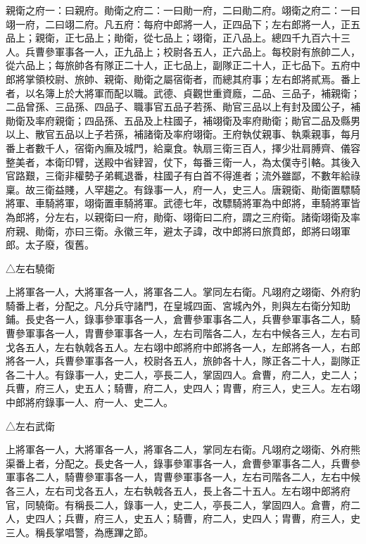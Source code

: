 \begin{pinyinscope}
 親衛之府一：曰親府。勛衛之府二：一曰勛一府，二曰勛二府。翊衛之府二：一曰翊一府，二曰翊二府。凡五府：每府中郎將一人，正四品下；左右郎將一人，正五品上；親衛，正七品上；勛衛，從七品上；翊衛，正八品上。總四千九百六十三人。兵曹參軍事各一人，正九品上；校尉各五人，正六品上。每校尉有旅帥二人，從六品上；每旅帥各有隊正二十人，正七品上，副隊正二十人，正七品下。五府中郎將掌領校尉、旅帥、親衛、勛衛之屬宿衛者，而總其府事；左右郎將貳焉。番上者，以名簿上於大將軍而配以職。武德、貞觀世重資廕，二品、三品子，補親衛；二品曾孫、三品孫、四品子、職事官五品子若孫、勛官三品以上有封及國公子，補勛衛及率府親衛；四品孫、五品及上柱國子，補翊衛及率府勛衛；勛官二品及縣男以上、散官五品以上子若孫，補諸衛及率府翊衛。王府執仗親事、執乘親事，每月番上者數千人，宿衛內廡及城門，給稟食。執扇三衛三百人，擇少壯肩膊齊、儀容整美者，本衛印臂，送殿中省肄習，仗下，每番三衛一人，為太僕寺引輅。其後入官路艱，三衛非權勢子弟輒退番，柱國子有白首不得進者；流外雖鄙，不數年給祿稟。故三衛益賤，人罕趨之。有錄事一人，府一人，史三人。唐親衛、勛衛置驃騎將軍、車騎將軍，翊衛置車騎將軍。武德七年，改驃騎將軍為中郎將，車騎將軍皆為郎將，分左右，以親衛曰一府，勛衛、翊衛曰二府，謂之三府衛。諸衛翊衛及率府親、勛衛，亦曰三衛。永徽三年，避太子諱，改中郎將曰旅賁郎，郎將曰翊軍郎。太子廢，復舊。



 △左右驍衛



 上將軍各一人，大將軍各一人，將軍各二人。掌同左右衛。凡翊府之翊衛、外府豹騎番上者，分配之。凡分兵守諸門，在皇城四面、宮城內外，則與左右衛分知助鋪。長史各一人，錄事參軍事各一人，倉曹參軍事各二人，兵曹參軍事各二人，騎曹參軍事各一人，胄曹參軍事各一人，左右司階各二人，左右中候各三人，左右司戈各五人，左右執戟各五人。左右翊中郎將府中郎將各一人，左郎將各一人，右郎將各一人，兵曹參軍事各一人，校尉各五人，旅帥各十人，隊正各二十人，副隊正各二十人。有錄事一人，史二人，亭長二人，掌固四人。倉曹，府二人，史二人；兵曹，府三人，史五人；騎曹，府二人，史四人；胄曹，府三人，史三人。左右翊中郎將府錄事一人、府一人、史二人。



 △左右武衛



 上將軍各一人，大將軍各一人，將軍各二人，掌同左右衛。凡翊府之翊衛、外府熊渠番上者，分配之。長史各一人，錄事參軍事各一人，倉曹參軍事各二人，兵曹參軍事各二人，騎曹參軍事各一人，胄曹參軍事各一人，左右司階各二人，左右中候各三人，左右司戈各五人，左右執戟各五人，長上各二十五人。左右翊中郎將府官，同驍衛。有稱長二人，錄事一人，史二人，亭長二人，掌固四人。倉曹，府二人，史四人；兵曹，府三人，史五人；騎曹，府二人，史四人；胄曹，府三人，史三人。稱長掌唱警，為應蹕之節。




\end{pinyinscope}
